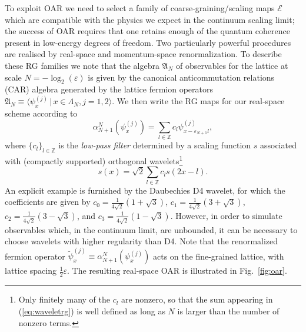 \documentclass[12pt]{article}
\newcommand{\1}{\mathds{1}}
\newcommand{\vep}{\varepsilon}
\begin{document}
To exploit OAR we need to select a family of coarse-graining/scaling maps $\mathcal{E}$ which are compatible with the physics we expect in the continuum scaling limit; the success of OAR requires that one retains enough of the quantum coherence present in low-energy degrees of freedom. Two particularly powerful procedures are realised by real-space and momentum-space renormalization. To describe these RG families we note that the algebra $\mathfrak{A}_N$ of observables for the lattice at scale $N=-\log_2(\vep)$ is given by the canonical anticommutation relations (CAR) algebra generated by the lattice fermion operators $\mathfrak{A}_N \equiv \langle \psi_x^{(j)}\,|\, x\in \Lambda_N, j = 1,2\rangle$. We then write the RG maps for our real-space scheme according to 
\begin{equation}\label{eq:waveletrg}
	\alpha_{N+1}^N(\psi_x^{(j)}) = \sum_{l\in \mathbb{Z}} c_l \psi_{x-\vep_{N+1}l}^{(j)},
\end{equation}
where $\{c_l\}_{l\in \mathbb{Z}}$ is the \emph{low-pass filter} determined by a scaling function $s$ associated with (compactly supported) orthogonal wavelets\footnote{Only finitely many of the $c_l$ are nonzero, so that the sum appearing in (\ref{eq:waveletrg}) is well defined as long as $N$  is larger than the number of nonzero terms.} \cite{daubechiesTenLecturesWavelets1992}
\begin{equation}
	s(x) = \sqrt{2} \sum_{l\in\mathbb{Z}}  c_l s(2x -l).
\end{equation}
An explicit example is furnished by the Daubechies D4 wavelet, for which the coefficients are given by $c_0 = \frac{1}{4\sqrt{2}}(1+\sqrt{3})$, $c_1 = \frac{1}{4\sqrt{2}}(3+\sqrt{3})$, $c_2 = \frac{1}{4\sqrt{2}}(3-\sqrt{3})$, and $c_3 = \frac{1}{4\sqrt{2}}(1-\sqrt{3})$. However, in order to simulate observables which, in the continuum limit, are unbounded, it can be necessary to choose wavelets with higher regularity than D4.
Note that the renormalized fermion operator $\widetilde{\psi}_x^{(j)} \equiv \alpha_{N+1}^N(\psi_x^{(j)})$ acts on the fine-grained lattice, with lattice spacing $\frac12\vep$. The resulting real-space OAR is illustrated in Fig.~\ref{fig:oar}.
\end{document}
